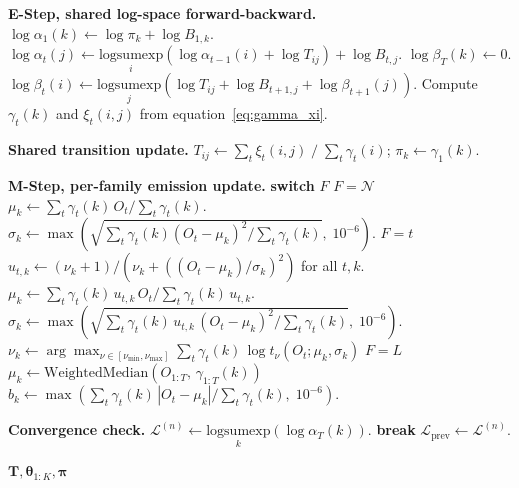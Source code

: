 \begin{algorithm}[tp]
\begin{algorithmic}[1]
    \STATE \textbf{E-Step, shared log-space forward-backward.}
    \STATE $\log \alpha_1(k) \leftarrow \log \pi_k + \log B_{1,k}$.
        \STATE $\log \alpha_t(j) \leftarrow \underset{i}{\text{logsumexp}}\!\left(\log \alpha_{t-1}(i) + \log T_{ij}\right) + \log B_{t,j}$.
    \ENDFOR
    \STATE $\log \beta_T(k) \leftarrow 0$.
        \STATE $\log \beta_t(i) \leftarrow \underset{j}{\text{logsumexp}}\!\left(\log T_{ij} + \log B_{t+1,j} + \log \beta_{t+1}(j)\right)$.
    \ENDFOR
    \STATE Compute $\gamma_t(k)$ and $\xi_t(i,j)$ from equation~\eqref{eq:gamma_xi}.

    \STATE \textbf{Shared transition update.} $T_{ij} \leftarrow \sum_t \xi_t(i,j) \;/\; \sum_t \gamma_t(i)$; $\pi_k \leftarrow \gamma_1(k)$.

    \STATE \textbf{M-Step, per-family emission update.} \label{line:mstep}
    \STATE \textbf{switch} $F$
    \STATE \quad $F = \mathcal{N}$ 
    \STATE \qquad $\mu_k \leftarrow \sum_t \gamma_t(k)\, O_t / \sum_t \gamma_t(k)$.
    \STATE \qquad $\sigma_k \leftarrow \max\!\left(\sqrt{\sum_t \gamma_t(k) (O_t - \mu_k)^2 / \sum_t \gamma_t(k)},\; 10^{-6}\right)$.
    \STATE \quad $F = t$ 
    \STATE \qquad $u_{t,k} \leftarrow (\nu_k + 1) / (\nu_k + ((O_t - \mu_k)/\sigma_k)^2)$ for all $t, k$.
    \STATE \qquad $\mu_k \leftarrow \sum_t \gamma_t(k)\, u_{t,k}\, O_t / \sum_t \gamma_t(k)\, u_{t,k}$.
    \STATE \qquad $\sigma_k \leftarrow \max\!\left(\sqrt{\sum_t \gamma_t(k)\, u_{t,k}\,(O_t - \mu_k)^2 / \sum_t \gamma_t(k)},\; 10^{-6}\right)$.
    \STATE \qquad $\nu_k \leftarrow \arg\max_{\nu \in [\nu_{\min}, \nu_{\max}]} \sum_t \gamma_t(k)\, \log t_\nu(O_t; \mu_k, \sigma_k)$ 
    \STATE \quad $F = L$ 
    \STATE \qquad $\mu_k \leftarrow \text{WeightedMedian}(O_{1:T},\, \gamma_{1:T}(k))$ 
    \STATE \qquad $b_k \leftarrow \max\!\left(\sum_t \gamma_t(k)\, |O_t - \mu_k| / \sum_t \gamma_t(k),\; 10^{-6}\right)$.

    \STATE \textbf{Convergence check.} $\mathcal{L}^{(n)} \leftarrow \underset{k}{\text{logsumexp}}(\log \alpha_T(k))$.
     \STATE \textbf{break} \ENDIF
    \STATE $\mathcal{L}_{\text{prev}} \leftarrow \mathcal{L}^{(n)}$.
\ENDFOR

\RETURN $\mathbf{T}, \boldsymbol\theta_{1:K}, \boldsymbol{\pi}$ 
\end{algorithmic}
\end{algorithm}

